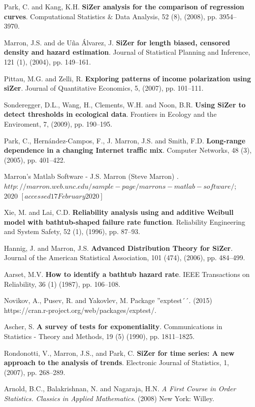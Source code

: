 \documentclass[preprint,12pt]{elsarticle}
\begin{document}
\begin{thebibliography}{}
 Park, C. and Kang, K.H. \textbf{SiZer analysis for the comparison of regression curves}. Computational Statistics $\&$ Data Analysis, 52 (8), (2008), pp. 3954--3970. 


 Marron, J.S. and de U\~na \'Alvarez, J. \textbf{SiZer for length biased, censored density and hazard estimation}. Journal of Statistical Planning and Inference, 121 (1), (2004), pp. 149--161. 

 Pittau, M.G. and Zelli, R. \textbf{Exploring patterns of income polarization using siZer}. Journal of Quantitative Economics, 5, (2007), pp. 101--111.


 Sonderegger, D.L., Wang, H., Clements, W.H. and Noon, B.R. \textbf{Using SiZer to detect thresholds in ecological data}. Frontiers in Ecology and the Enviroment, 7, (2009), pp. 190--195.


 Park, C., Hern\'andez-Campos, F., J. Marron, J.S. and Smith, F.D. \textbf{Long-range dependence in a changing Internet traffic mix}. Computer Networks, 48 (3), (2005), pp. 401--422.



 Marron's Matlab Software - J.S. Marron (Steve Marron) . $http://marron.web.unc.edu/sample-page/marrons-matlab-software/$; 2020 $[accessed 17 February 2020]$


 
 Xie, M. and Lai, C.D.  \textbf{Reliability analysis using and additive Weibull model with bathtub-shaped failure rate function}. Reliability Engineering and System Safety, 52 (1), (1996), pp. 87--93.



 Hannig, J. and Marron, J.S. \textbf{Advanced Distribution Theory for SiZer}. Journal of the American Statistical Association, 101 (474), (2006), pp. 484--499. 

 Aarset, M.V. \textbf{How to identify a bathtub hazard rate}. IEEE Transactions on Reliability, 36 (1) (1987), pp. 106--108.

 Novikov, A., Pusev, R. and Yakovlev, M. Package ''exptest´´. (2015) https://cran.r-project.org/web/packages/exptest/.


 Ascher, S. \textbf{A survey of tests for exponentiality}. Communications in Statistics - Theory and Methods, 19 (5) (1990), pp. 1811--1825.



 Rondonotti, V., Marron, J.S., and Park, C. \textbf{SiZer for time series: A new approach to the analysis of trends}. Electronic Journal of Statistics, 1, (2007), pp. 268--289.



 Arnold, B.C., Balakrishnan, N. and Nagaraja, H.N. \textit{A First Course in Order Statistics. Classics in Applied Mathematics}. (2008) New York: Willey. 





\end{thebibliography}
\end{document}
